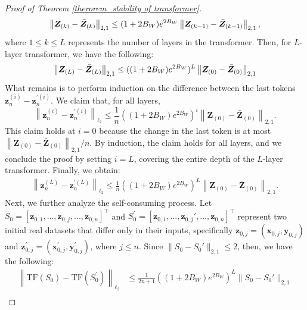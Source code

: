 \begin{proof}[Proof of Theorem \ref{therorem_stability of transformer}]
\begin{align}
    \left\|\boldsymbol{Z}_{(k)}-\bar{\boldsymbol{Z}}_{(k)}\right\|_{2,1} \leq(1+2B_W) e^{2B_W}\left\|\boldsymbol{Z}_{(k-1)}-\bar{\boldsymbol{Z}}_{(k-1)}\right\|_{2,1}, \notag
\end{align}
where $1\leq k \leq L$ represents the number of layers in the transformer. Then, for $L$-layer transformer, we have the following:
\begin{align}
    \left\|\boldsymbol{Z}_{(L)}-\bar{\boldsymbol{Z}}_{(L)}\right\|_{2,1} \leq((1+2B_W) e^{2B_W})^L\left\|\boldsymbol{Z}_{(0)}-\bar{\boldsymbol{Z}}_{(0)}\right\|_{2,1} \notag
\end{align}
What remains is to perform induction on the difference between the last tokens $\boldsymbol{z}_n^{(i)}-\boldsymbol{z}_n^{\prime(i)}$. We claim that, for all layers, 
$$
\left\|\boldsymbol{z}_n^{(i)}-\boldsymbol{z}_n^{\prime(i)}\right\|_{\ell_2} \leq \frac{1}{n}((1+2B_W) e^{2B_W})^i\left\|\boldsymbol{Z}_{(0)}-\bar{\boldsymbol{Z}}_{(0)}\right\|_{2,1} .
$$
This claim holds at $i=0$ because the change in the last token is at most $\left\|\boldsymbol{Z}_{(0)}-\bar{\boldsymbol{Z}}_{(0)}\right\|_{2,1} / n$. By induction, the claim holds for all layers, and we conclude the proof by setting $i=L$, covering the entire depth of the $L$-layer transformer. Finally, we obtain:
\begin{align}
    \left\|\boldsymbol{z}_n^{(L)}-\boldsymbol{z}_n^{\prime(L)}\right\|_{\ell_2} \leq \frac{1}{n}((1+2B_W) e^{2B_W})^L\left\|\boldsymbol{Z}_{(0)}-\bar{\boldsymbol{Z}}_{(0)}\right\|_{2,1} .
\end{align}                                                       
Next, we further analyze the self-consuming process. Let $S_0=[\boldsymbol{z}_{0,1},...,\boldsymbol{z}_{0,j},...,\boldsymbol{z}_{0,n}]^{\top}$ and $S_0^{\prime}=[\boldsymbol{z}_{0,1},...,\boldsymbol{z}_{0,j}',...,\boldsymbol{z}_{0,n}]^{\top}$ represent two initial real datasets that differ only in their inputs, specifically $\boldsymbol{z}_{0,j}=\left(\boldsymbol{x}_{0,j}, \boldsymbol{y}_{0,j}\right)$ and $\boldsymbol{z}_{0,j}^{\prime}=\left(\boldsymbol{x}_{0,j}^{\prime}, \boldsymbol{y}_{0,j}^{\prime}\right)$, where $j \leq n$. Since $\|S_0-S_0'\|_{2,1}\leq 2$, then, we have the following:
\begin{align}
    \left\|\mathrm{TF}\left(S_0\right)-\mathrm{TF}\left(S_{0}^{\prime}\right)\right\|_{\ell_2} &\leq 
    \frac{1}{2 n+1}\left((1+2B_W) e^{2B_W}\right)^L\|S_0-S_0'\|_{2,1} \label{proof_tramsfor_output}\\

\end{align}
\end{proof}

